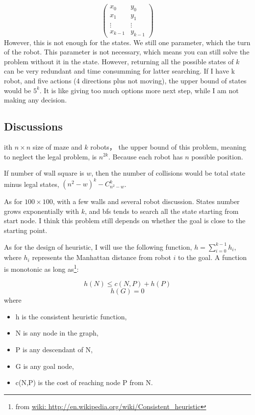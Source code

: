 \documentclass{article}
\begin{document}
$$\begin{pmatrix}
x_0 & y_0 \\
x_1 & y_1 \\
\vdots & \vdots \\	
x_{k-1} & y_{k-1}
\end{pmatrix}$$
However, this is not enough for the states. We still one parameter, which the turn of the robot. This parameter is not necessary, which means you can still solve the problem without it in the state. However, returning all the possible states of $k$ can be very redundant and time consumming for latter searching. If I have k robot, and five actions (4 directions plus not moving), the upper bound of states would be $5^k$. It is like giving too much options more next step, while I am not making any decision.











\subsection{Discussions}
ith $n\times n$ size of maze and $k$ robots， the upper bound of this problem, meaning to neglect the legal problem, is $n^{2k}$. Because each robot has $n$ possible position.

If number of wall square is $w$, then the number of collisions would be total state minus legal states, $(n^2-w)^k - C_{n^2-w}^k$. 

As for $100\times100$, with a few walls and several robot discussion. States number grows exponentially with $k$, and bfs tends to search all the state starting from start node. I think this problem still depends on whether the goal is close to the starting point.

As for the design of heuristic, I will use the following function,
$h = \sum^{k-1}_{i=0}h_i$, where $h_i$ represents the Manhattan distance from robot $i$ to the goal. A function is monotonic as long as\footnote{from \url{wiki: http://en.wikipedia.org/wiki/Consistent_heuristic}}:

$$h(N) \leq c(N,P)+h(P) $$
$$h(G)=0$$
where

\begin{itemize}
\item h is the consistent heuristic function,
\item N is any node in the graph,
\item P is any descendant of N,
\item G is any goal node,
\item c(N,P) is the cost of reaching node P from N.
\end{itemize}
\end{document}
